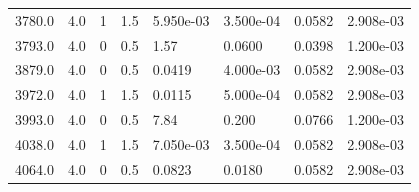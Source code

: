 \documentclass[preview]{standalone}
\begin{document}
{{\begin{tabular}{L{1.2cm}C{1.2cm} C{0.3cm}C{0.5cm} C{1.4cm}C{1.4cm} C{1.4cm}C{1.4cm}}
  3780.0  &   4.0  & 1     & 1.5 &  5.950e-03  & 3.500e-04  & 0.0582 &  2.908e-03   \\ 
  3793.0  &   4.0  & 0     & 0.5 &  1.57  & 0.0600  & 0.0398 &  1.200e-03   \\ 
  3879.0  &   4.0  & 0     & 0.5 &  0.0419  & 4.000e-03  & 0.0582 &  2.908e-03   \\ 
  3972.0  &   4.0  & 1     & 1.5 &  0.0115  & 5.000e-04  & 0.0582 &  2.908e-03   \\ 
  3993.0  &   4.0  & 0     & 0.5 &  7.84  & 0.200  & 0.0766 &  1.200e-03   \\ 
  4038.0  &   4.0  & 1     & 1.5 &  7.050e-03  & 3.500e-04  & 0.0582 &  2.908e-03   \\ 
  4064.0  &   4.0  & 0     & 0.5 &  0.0823  & 0.0180  & 0.0582 &  2.908e-03   \\ 
\hline 
\end{tabular} 

}}
\end{document}
